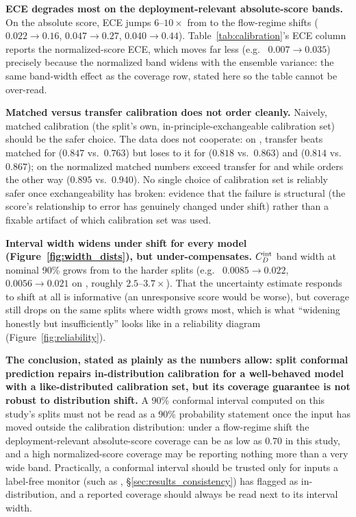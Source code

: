 \textbf{ECE degrades most on the deployment-relevant absolute-score bands.}
On the absolute score, ECE jumps $6$--$10\times$ from  to the
flow-regime shifts (\Mgnn{} $0.022\to0.16$, \Mfno{} $0.047\to0.27$, \Mtrans{}
$0.040\to0.44$). Table~\ref{tab:calibration}'s ECE column reports the
normalized-score ECE, which moves far less (e.g.\ \Mtrans{} $0.007\to0.035$)
precisely because the normalized band widens with the ensemble variance: the
same band-width effect as the coverage row, stated here so the table cannot be
over-read.

\textbf{Matched versus transfer calibration does not order cleanly.} Naively,
matched calibration (the split's own, in-principle-exchangeable calibration
set) should be the safer choice. The data does not cooperate: on
, transfer beats matched for \Mfno{} ($0.847$ vs.\ $0.763$)
but loses to it for \Mgnn{} ($0.818$ vs.\ $0.863$) and \Mtrans{} ($0.814$
vs.\ $0.867$); on  the normalized matched numbers exceed
transfer for \Mgnn{} and \Mtrans{} while \Mfno{} orders the other way
($0.895$ vs.\ $0.940$). No single choice of calibration set is reliably safer
once exchangeability has broken: evidence that the failure is structural (the
score's relationship to error has genuinely changed under shift) rather than
a fixable artifact of which calibration set was used.

\textbf{Interval width widens under shift for every model
(Figure~\ref{fig:width_dists}), but under-compensates.} $C_D^{\text{int}}$ band width at
nominal 90\% grows from  to the harder splits (e.g.\ \Mfno{}
$0.0085\to0.022$, \Mtrans{} $0.0056\to0.021$ on , roughly
$2.5$--$3.7\times$). That the uncertainty estimate responds to shift at all is
informative (an unresponsive score would be worse), but coverage still drops
on the same splits where width grows most, which is what ``widening honestly
but insufficiently'' looks like in a reliability diagram
(Figure~\ref{fig:reliability}).

\textbf{The conclusion, stated as plainly as the numbers allow: split
conformal prediction repairs in-distribution calibration for a well-behaved
model with a like-distributed calibration set, but its coverage guarantee is
not robust to distribution shift.} A 90\% conformal interval computed on this
study's splits must not be read as a 90\% probability statement once the input
has moved outside the calibration distribution: under a flow-regime shift the
deployment-relevant absolute-score coverage can be as low as $0.70$ in this
study, and a high normalized-score coverage may be reporting nothing more than
a very wide band. Practically, a conformal interval should be trusted only for
inputs a label-free monitor (such as \FSC, \S\ref{sec:results_consistency})
has flagged as in-distribution, and a reported coverage should always be read
next to its interval width.

